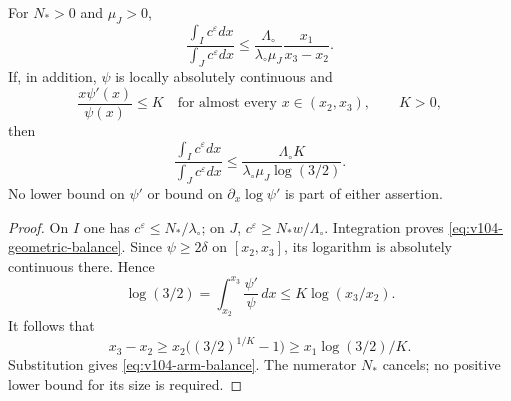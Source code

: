 \begin{lemma}
\label{lem:v104-arm-balance}
For $N_*>0$ and $\mu_J>0$,
\begin{equation}\label{eq:v104-geometric-balance}
 \frac{\int_Ic^\varepsilon dx}{\int_Jc^\varepsilon dx}
 \le\frac{\Lambda_\circ}{\lambda_\circ\mu_J}\frac{x_1}{x_3-x_2}.
\end{equation}
If, in addition, $\psi$ is locally absolutely continuous and
\begin{equation}\label{eq:v104-elasticity}
 \frac{x\psi'(x)}{\psi(x)}\le K
           \quad\text{for almost every }x\in(x_2,x_3),
           \qquad K>0,
\end{equation}
then
\begin{equation}\label{eq:v104-arm-balance}
 \frac{\int_Ic^\varepsilon dx}{\int_Jc^\varepsilon dx}
 \le\frac{\Lambda_\circ K}
          {\lambda_\circ\mu_J\log(3/2)}.
\end{equation}
No lower bound on $\psi'$ or bound on $\partial_x\log\psi'$ is
part of either assertion.
\end{lemma}
\begin{proof}
On $I$ one has $c^\varepsilon\le N_*/\lambda_\circ$; on $J$,
$c^\varepsilon\ge N_*w/\Lambda_\circ$. Integration proves
\eqref{eq:v104-geometric-balance}. Since $\psi\ge2\delta$ on
$[x_2,x_3]$, its logarithm is absolutely continuous there. Hence
\[
 \log(3/2)=\int_{x_2}^{x_3}\frac{\psi'}{\psi}\,dx
                \le K\log(x_3/x_2).
\]
It follows that
\[
 x_3-x_2\ge x_2\bigl((3/2)^{1/K}-1\bigr)
              \ge x_1\log(3/2)/K.
\]
Substitution gives \eqref{eq:v104-arm-balance}. The numerator $N_*$
cancels; no positive lower bound for its size is required.
\end{proof}

